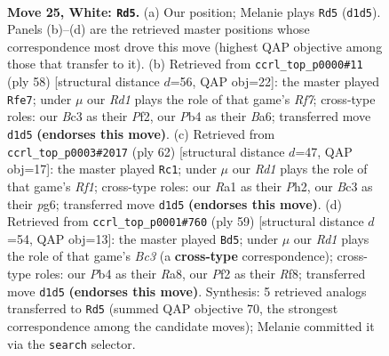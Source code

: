 \documentclass[11pt]{article}
\begin{document}
\clearpage

\begin{figure}[p]\centering
\begin{subfigure}{0.46\textwidth}\centering
\resizebox{\linewidth}{!}{%
\newchessgame
\chessboard[
  setfen={rn2k1r1/p7/8/5pP1/1P6/2B5/P3bP2/R2R2K1 w q - 0 25},
  showmover=false,
  pgfstyle=straightmove, color=movearrow, markmove={d1-d5}
]}
\caption{}
\end{subfigure}\hfill
\begin{subfigure}{0.46\textwidth}\centering
\resizebox{\linewidth}{!}{%
\newchessgame
\chessboard[
  setfen={1r4k1/2R2R2/B3b3/p5rp/8/8/1P3P1K/8 w - - 3 30},
  showmover=false,
  pgfstyle=straightmove, color=movearrow, markmove={f7-e7}
]}
\caption{}
\end{subfigure}
\\[4pt]
\begin{subfigure}{0.46\textwidth}\centering
\resizebox{\linewidth}{!}{%
\newchessgame
\chessboard[
  setfen={4nr1k/7p/B5p1/2pPp3/8/5P2/6PP/5RK1 w - - 0 32},
  showmover=false,
  pgfstyle=straightmove, color=movearrow, markmove={f1-c1}
]}
\caption{}
\end{subfigure}\hfill
\begin{subfigure}{0.46\textwidth}\centering
\resizebox{\linewidth}{!}{%
\newchessgame
\chessboard[
  setfen={r4rk1/1pR2n1p/2b2Pp1/8/8/4R1P1/1B2B3/6K1 b - - 2 30},
  showmover=false,
  pgfstyle=straightmove, color=movearrow, markmove={c6-d5}
]}
\caption{}
\end{subfigure}
\caption{\textbf{Move 25, White: \texttt{Rd5}.} (a) Our position; Melanie plays \texttt{Rd5} (\texttt{d1d5}). Panels (b)--(d) are the retrieved master positions whose correspondence most drove this move (highest QAP objective among those that transfer to it). (b) Retrieved from \texttt{ccrl\_top\_p0000\#11} (ply 58) [structural distance $d$=56, QAP obj=22]: the master played \texttt{Rfe7}; under $\mu$ our \emph{Rd1} plays the role of that game's \emph{Rf7}; cross-type roles: our \emph{B}c3 as their \emph{P}f2, our \emph{P}b4 as their \emph{B}a6; transferred move \texttt{d1d5} \textbf{(endorses this move)}. (c) Retrieved from \texttt{ccrl\_top\_p0003\#2017} (ply 62) [structural distance $d$=47, QAP obj=17]: the master played \texttt{Rc1}; under $\mu$ our \emph{Rd1} plays the role of that game's \emph{Rf1}; cross-type roles: our \emph{R}a1 as their \emph{P}h2, our \emph{B}c3 as their \emph{p}g6; transferred move \texttt{d1d5} \textbf{(endorses this move)}. (d) Retrieved from \texttt{ccrl\_top\_p0001\#760} (ply 59) [structural distance $d$=54, QAP obj=13]: the master played \texttt{Bd5}; under $\mu$ our \emph{Rd1} plays the role of that game's \emph{Bc3} (a \textbf{cross-type} correspondence); cross-type roles: our \emph{P}b4 as their \emph{R}a8, our \emph{P}f2 as their \emph{R}f8; transferred move \texttt{d1d5} \textbf{(endorses this move)}. Synthesis: 5 retrieved analogs transferred to \texttt{Rd5} (summed QAP objective 70, the strongest correspondence among the candidate moves); Melanie committed it via the \texttt{search} selector.}
\label{fig:thought-m48}
\end{figure}
\end{document}
